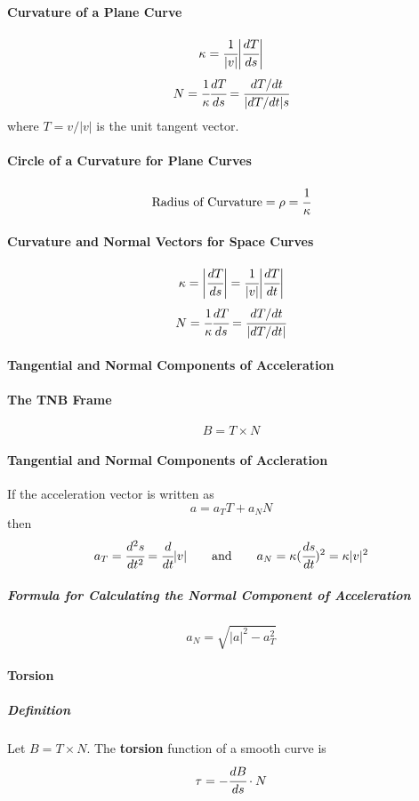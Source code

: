 \documentclass{article}
\begin{document}
            \paragraph{Curvature of a Plane Curve}
                \[\kappa=\cfrac{1}{|v|}\bigg|\cfrac{dT}{ds}\bigg|\]
                \[N=\cfrac{1}{\kappa}\cfrac{dT}{ds}=\cfrac{dT/dt}{|dT/dt|s}\]
                where $T=v/|v|$ is the unit tangent vector.
            \paragraph{Circle of a Curvature for Plane Curves}    
                \[\text{Radius of Curvature}=\rho=\cfrac{1}{\kappa}\]
            \paragraph{Curvature and Normal Vectors for Space Curves}
                \[\kappa=\bigg|\cfrac{dT}{ds}\bigg|=\cfrac{1}{|v|}\bigg|\cfrac{dT}{dt}\bigg|\]
                \[N=\cfrac{1}{\kappa}\cfrac{dT}{ds}=\cfrac{dT/dt}{|dT/dt|}\]
            \paragraph{Tangential and Normal Components of Acceleration}
                \paragraph{The TNB Frame}
                    \[B=T\times N\]
                \paragraph{Tangential and Normal Components of Accleration}
                    If the acceleration vector is written as 
                    \[a=a_TT+a_NN\]
                    then
                    \[a_T=\cfrac{d^2s}{dt^2}=\cfrac{d}{dt}|v|\qquad \text{and}\qquad a_N=\kappa(\cfrac{ds}{dt})^2=\kappa|v|^2\]
                    \subparagraph{Formula for Calculating the Normal Component of Acceleration}
                        \[a_N=\sqrt{|a|^2-a_T^2}\]
                \paragraph{Torsion}
                    \subparagraph{Definition} Let $B=T\times N$. The \textbf{torsion} function of a smooth curve is
                    \[\tau=-\cfrac{dB}{ds}\cdot N\]
\end{document}
